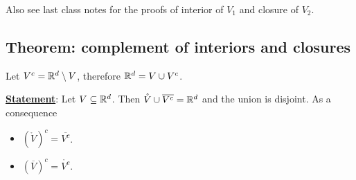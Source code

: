\documentclass[10pt]{extarticle}
\begin{document}
                Also see last class notes for the proofs of interior of $V_1$ and closure of $V_2$.

                \subsection{Theorem: complement of interiors and closures}

                Let $V^c = \mathbb{R}^d \setminus V$, therefore $\mathbb{R}^d = V \cup V^c$.

                \textbf{\underline{Statement}}: Let $V \subseteq \mathbb{R}^d$.
                Then $\mathring{V} \cup \overline{V^c} = \mathbb{R}^d$ and the union is disjoint.
                As a consequence
                \begin{itemize}
                    \item $\left(\mathring{V}\right)^c = \overline{V^c}$.
                    \item $\left(\overline{V}\right)^c = \mathring{V^c}$.
                \end{itemize}
\end{document}
